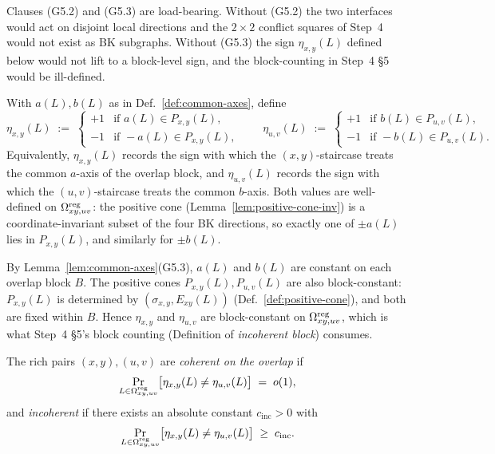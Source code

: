 \begin{remark}\label{rem:g5-load-bearing}
Clauses (G5.2) and (G5.3) are load-bearing. Without (G5.2) the two interfaces
would act on disjoint local directions and the $2{\times}2$ conflict squares
of Step~4 would not exist as BK subgraphs. Without (G5.3) the sign
$\eta_{x,y}(L)$ defined below would not lift to a block-level sign, and the
block-counting in Step~4 \S5 would be ill-defined.
\end{remark}

\begin{definition}\label{def:eta}
With $a(L),b(L)$ as in Def.~\ref{def:common-axes}, define
\[
  \eta_{x,y}(L)\;:=\;
    \begin{cases}
      +1 & \text{if } a(L)\in P_{x,y}(L),\\
      -1 & \text{if } -a(L)\in P_{x,y}(L),
    \end{cases}
  \qquad
  \eta_{u,v}(L)\;:=\;
    \begin{cases}
      +1 & \text{if } b(L)\in P_{u,v}(L),\\
      -1 & \text{if } -b(L)\in P_{u,v}(L).
    \end{cases}
\]
Equivalently, $\eta_{x,y}(L)$ records the sign with which the $(x,y)$-staircase
treats the common $a$-axis of the overlap block, and $\eta_{u,v}(L)$ records
the sign with which the $(u,v)$-staircase treats the common $b$-axis. Both
values are well-defined on $\Omega^{\mathrm{reg}}_{xy,uv}$: the positive cone
(Lemma~\ref{lem:positive-cone-inv}) is a coordinate-invariant subset of
the four BK directions, so exactly one of
$\pm a(L)$ lies in $P_{x,y}(L)$, and similarly for $\pm b(L)$.
\end{definition}

\begin{remark}\label{rem:eta-block-constant}
By Lemma~\ref{lem:common-axes}(G5.3), $a(L)$ and $b(L)$ are constant on each
overlap block $B$. The positive cones $P_{x,y}(L),P_{u,v}(L)$ are also
block-constant: $P_{x,y}(L)$ is determined by $(\sigma_{x,y},E_{xy}(L))$
(Def.~\ref{def:positive-cone}), and both are fixed within $B$. Hence
$\eta_{x,y}$ and $\eta_{u,v}$ are block-constant on $\Omega^{\mathrm{reg}}_{xy,uv}$,
which is what Step~4 \S5's block counting (Definition of
\emph{incoherent block}) consumes.
\end{remark}

\begin{definition}\label{def:coherent}
The rich pairs $(x,y),(u,v)$ are \emph{coherent on the overlap} if
\[
  \Pr_{L\in\Omega^{\mathrm{reg}}_{xy,uv}}\bigl[\eta_{x,y}(L)\neq \eta_{u,v}(L)\bigr]\;=\;o(1),
\]
and \emph{incoherent} if there exists an absolute constant $c_{\mathrm{inc}}>0$
with
\[
  \Pr_{L\in\Omega^{\mathrm{reg}}_{xy,uv}}\bigl[\eta_{x,y}(L)\neq \eta_{u,v}(L)\bigr]\;\ge\;c_{\mathrm{inc}}.
\]
\end{definition}


